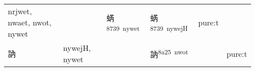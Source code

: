 \documentclass[14pt,a4paper]{scrartcl}
\begin{document}
\begin{longtable}[c]{@{}llllll@{}}
\begin{minipage}[t]{0.14\columnwidth}
nrjwet, nwaet, nwot, nywet
\strut\end{minipage} &
\begin{minipage}[t]{0.14\columnwidth}\raggedright\strut
\strut\end{minipage} &
\begin{minipage}[t]{0.14\columnwidth}\raggedright\strut
蜹\textsuperscript{8739~nywet}
\strut\end{minipage} &
\begin{minipage}[t]{0.14\columnwidth}\raggedright\strut
蜹\textsuperscript{8739~nywejH}
\strut\end{minipage} &
\begin{minipage}[t]{0.14\columnwidth}\raggedright\strut
pure:t
\strut\end{minipage}\tabularnewline
\begin{minipage}[t]{0.14\columnwidth}\raggedright\strut
訥
\strut\end{minipage} &
\begin{minipage}[t]{0.14\columnwidth}\raggedright\strut
nywejH, nywet
\strut\end{minipage} &
\begin{minipage}[t]{0.14\columnwidth}\raggedright\strut
\strut\end{minipage} &
\begin{minipage}[t]{0.14\columnwidth}\raggedright\strut
訥\textsuperscript{8a25~nwot}
\strut\end{minipage} &
\begin{minipage}[t]{0.14\columnwidth}\raggedright\strut
\strut\end{minipage} &
\begin{minipage}[t]{0.14\columnwidth}\raggedright\strut
pure:t
\strut\end{minipage}\tabularnewline
\bottomrule
\end{longtable}
\end{document}
